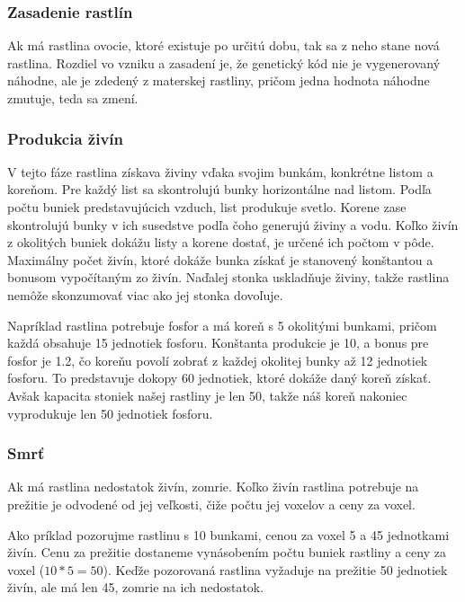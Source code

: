 \documentclass[12pt]{article}
\begin{document}
\subsubsection{Zasadenie rastlín}

Ak má rastlina ovocie, ktoré existuje po určitú dobu, tak sa z neho stane nová
rastlina. Rozdiel vo vzniku a zasadení je, že genetický kód nie je
vygenerovaný náhodne, ale je zdedený z materskej rastliny,
pričom jedna hodnota náhodne zmutuje, teda sa zmení.

\subsubsection{Produkcia živín}

V tejto fáze rastlina získava živiny vďaka svojim bunkám, konkrétne listom
a koreňom. Pre každý list sa skontrolujú bunky horizontálne nad listom.
Podľa počtu buniek predstavujúcich vzduch, list produkuje svetlo.
Korene zase skontrolujú bunky v ich susedstve podľa čoho generujú živiny a vodu.
Koľko živín z okolitých buniek dokážu listy a korene dostať,
je určené ich počtom v pôde. Maximálny počet živín, ktoré dokáže bunka získať je stanovený
konštantou a bonusom vypočítaným zo živín. Naďalej stonka uskladňuje živiny, takže
rastlina nemôže skonzumovať viac ako jej stonka dovoľuje.

Napríklad rastlina potrebuje fosfor a má koreň s 5 okolitými bunkami,
pričom každá obsahuje 15 jednotiek fosforu. Konštanta produkcie je 10,
a bonus pre fosfor je 1.2, čo koreňu povolí zobrať z každej okolitej bunky až 12
jednotiek fosforu. To predstavuje dokopy 60 jednotiek, ktoré dokáže daný koreň získať.
Avšak kapacita stoniek našej rastliny je len 50, takže náš koreň nakoniec
vyprodukuje len 50 jednotiek fosforu.

\subsubsection{Smrť}

Ak má rastlina nedostatok živín, zomrie. Koľko živín rastlina
potrebuje na prežitie je odvodené od jej veľkosti, čiže počtu jej voxelov
a ceny za voxel.

Ako príklad pozorujme rastlinu s 10 bunkami, cenou za voxel 5 a 45 jednotkami živín.
Cenu za prežitie dostaneme vynásobením počtu buniek rastliny a ceny za voxel
($10 * 5 = 50$). Keďže pozorovaná rastlina vyžaduje na prežitie 50 jednotiek živín, ale má
len 45, zomrie na ich nedostatok.
\end{document}
